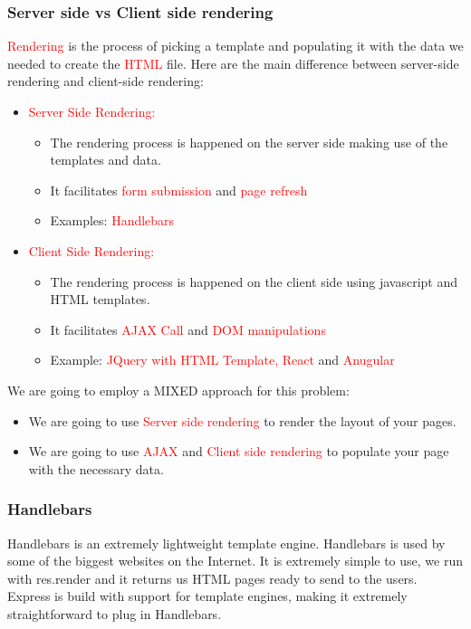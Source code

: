 \documentclass[a4paper]{article}
\begin{document}
\subsubsection{Server side vs Client side rendering}
\textcolor{red}{Rendering} is the process of picking a template and populating it with the data we needed to create the \textcolor{red}{HTML} file. Here are the main difference between server-side rendering and client-side rendering:\\
\begin{itemize}
\item \textcolor{red}{Server Side Rendering:}\\
         \begin{itemize}
         \item The rendering process is happened on the server side making use of the templates and data.
         \item It facilitates \textcolor{red}{form submission} and \textcolor{red}{page refresh}
         \item Examples: \textcolor{red}{Handlebars}
         \end{itemize}
\item \textcolor{red}{Client Side Rendering:} \\
         \begin{itemize}
         \item The rendering process is happened on the client side using javascript and HTML templates.
         \item  It facilitates \textcolor{red}{AJAX Call} and \textcolor{red}{DOM manipulations}
         \item Example: \textcolor{red}{JQuery with HTML Template, React} and \textcolor{red}{Anugular}
         \end{itemize}
\end{itemize}
We are going to employ a MIXED approach for this problem:
\begin{itemize}
\item We are going to use \textcolor{red}{Server side rendering} to render the layout of your pages.
\item We are going to use \textcolor{red}{AJAX} and \textcolor{red}{Client side rendering} to populate your page with the necessary data.
\end{itemize}
\subsubsection{Handlebars}
Handlebars is an extremely lightweight template engine. Handlebars is used by some of the biggest websites on the Internet. It is extremely simple to use, we run with res.render and it returns us HTML pages ready to send to the users. 
Express is build with support for template engines, making it extremely straightforward to plug in Handlebars.\\
\end{document}
